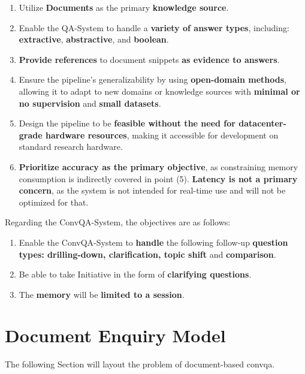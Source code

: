 \begin{enumerate}
    \item Utilize \textbf{Documents} as the primary \textbf{knowledge source}.
    \item Enable the QA-System to handle a \textbf{variety of answer types}, including: \textbf{extractive}, \textbf{abstractive}, and \textbf{boolean}.
    \item \textbf{Provide references} to document snippets \textbf{as evidence to answers}.
    \item Ensure the pipeline's generalizability by using \textbf{open-domain methods}, allowing it to adapt to new domains or knowledge sources with \textbf{minimal or no supervision} and \textbf{small datasets}.
    \item Design the pipeline to be \textbf{feasible without the need for datacenter-grade hardware resources}, making it accessible for development on standard research hardware.
    \item \textbf{Prioritize accuracy as the primary objective}, as constraining memory consumption is indirectly covered in point (5). \textbf{Latency is not a primary concern}, as the system is not intended for real-time use and will not be optimized for that.
\end{enumerate}


Regarding the ConvQA-System, the objectives are as follows:

\begin{enumerate}
    \item Enable the ConvQA-System to \textbf{handle} the following follow-up \textbf{question types: drilling-down, clarification, topic shift} and \textbf{comparison}.
    \item Be able to take Initiative in the form of \textbf{clarifying questions}.
    \item The \textbf{memory} will be \textbf{limited to a session}.
\end{enumerate}

\section{Document Enquiry Model}
\label{sec:problem_statement}

The following Section will layout the problem of document-based \gls{convqa}. 

